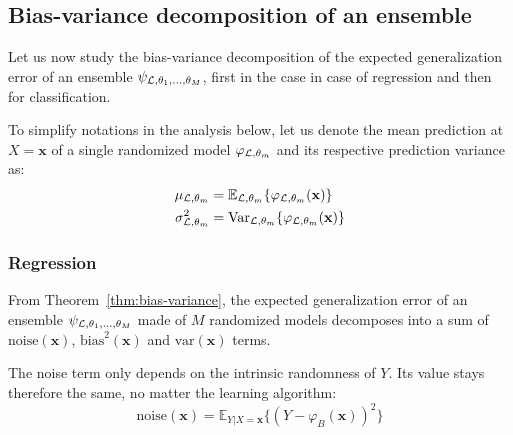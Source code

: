 \subsection{Bias-variance decomposition of an ensemble}
\label{sec:4:bias-variance:ensemble}

Let us now study the bias-variance decomposition of the expected generalization
error of an ensemble $\psi_{{\cal L},\theta_1,\dots,\theta_M}$, first in the
case in case of regression and then for classification.

To simplify notations in the analysis below, let us denote the mean prediction at
$X=\mathbf{x}$ of a single randomized model $\varphi_{{\cal L},\theta_m}$ and its
respective prediction variance as:
\begin{align}
\mu_{{\cal L},\theta_m} &= \mathbb{E}_{{\cal L},\theta_m} \{ \varphi_{{\cal L},\theta_m}(\mathbf{x}) \} \\
\sigma^2_{{\cal L},\theta_m} &= \text{Var}_{{\cal L},\theta_m} \{ \varphi_{{\cal L},\theta_m}(\mathbf{x}) \}
\end{align}

\subsubsection{Regression}

From Theorem~\ref{thm:bias-variance}, the expected generalization error of an
ensemble $\psi_{{\cal L},\theta_1,\dots,\theta_M}$ made of $M$ randomized
models decomposes into a sum of $\text{noise}(\mathbf{x})$,
$\text{bias}^2(\mathbf{x})$ and $\text{var}(\mathbf{x})$ terms.

The noise term only depends on the intrinsic randomness of $Y$. Its value
stays therefore the same, no matter the learning algorithm:
\begin{equation}
\text{noise}(\mathbf{x}) = \mathbb{E}_{Y|X=\mathbf{x}} \{ (Y - \varphi_B(\mathbf{x}))^2 \}
\end{equation}


